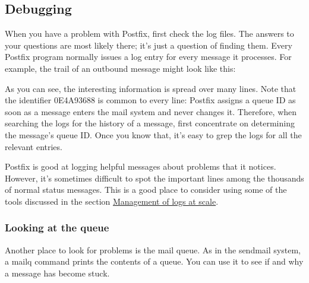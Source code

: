 \hypertarget{part0026_split_064.htmlux5cux23_idContainer1247}{}
\hypertarget{part0026_split_064.htmlux5cux23calibre_pb_63}{%
\subsection[Debugging]{\texorpdfstring{\protect\hypertarget{part0026_split_064.htmlux5cux23_idTextAnchor1194}{}{}\protect\hypertarget{part0026_split_064.htmlux5cux23_idIndexMarker2738}{}{}\protect\hypertarget{part0026_split_064.htmlux5cux23_idIndexMarker2739}{}{}\protect\hypertarget{part0026_split_064.htmlux5cux23_idTextAnchor1195}{}{}Debugging}{Debugging}}\label{part0026_split_064.htmlux5cux23calibre_pb_63}}

When you have a problem with Postfix, first check the log files. The
answers to your questions are most likely there; it's just a question of
finding them. Every Postfix program normally issues a log entry for
every message it processes. For example, the trail of an outbound
message might look like this:


As you can see, the interesting information is spread over many lines.
Note that the identifier 0E4A93688 is common to every line: Postfix
assigns a queue ID as soon as a message enters the mail system and never
changes it. Therefore, when searching the logs for the history of a
message, first concentrate on determining the message's queue ID. Once
you know that, it's easy to {grep} the logs for all the relevant
entries.

Postfix is good at logging helpful messages about problems that it
notices. However, it's sometimes difficult to spot the important lines
among the thousands of normal status messages. This is a good place to
consider using some of the tools discussed in the section
\protect\hyperlink{part0017_split_020.htmlux5cux23_idTextAnchor533}{{Management
of logs at scale}}.

\subsubsection[Looking at the
queue]{\texorpdfstring{\protect\hypertarget{part0026_split_064.htmlux5cux23_idTextAnchor1196}{}{}Looking
at the queue}{Looking at the queue}}

Another place to look for problems is the mail queue. As in the
{sendmail} system, a
\protect\hypertarget{part0026_split_064.htmlux5cux23_idIndexMarker2740}{}{}{mailq}
command prints the contents of a queue. You can use it to see if and why
a message has become stuck.

